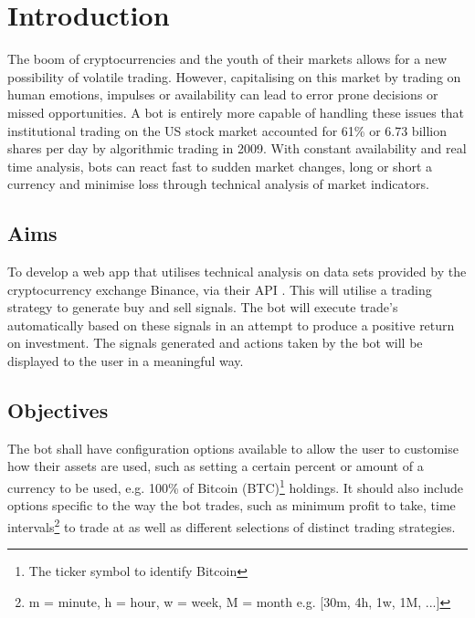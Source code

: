 
\chapter{Introduction}
\label{sec:intro}


The boom of cryptocurrencies and the youth of their markets allows for a new possibility of volatile trading. However, capitalising on this market by trading on human emotions, impulses or availability can lead to error prone decisions or missed opportunities. A bot is entirely more capable of handling these issues that institutional trading on the US stock market accounted for 61\% or 6.73 billion shares \cite{WEB:Cheng:2017} per day by algorithmic trading in 2009. With constant availability and real time analysis, bots can react fast to sudden market changes, long or short a currency and minimise loss through technical analysis of market indicators. \par






\section{Aims}
\label{sec:intro:aims}
\noindent To develop a web app that utilises technical analysis on data sets provided by the cryptocurrency exchange Binance, via their API \cite{WEB:BINANCE_API:2018}. This will utilise a trading strategy to generate buy and sell signals. The bot will execute trade's automatically based on these signals in an attempt to produce a positive return on investment. The signals generated and actions taken by the bot will be displayed to the user in a meaningful way.


\section{Objectives}
\label{sec:intro:objectives}
\noindent The bot shall have configuration options available to allow the user to customise how their assets are used, such as setting a certain percent or amount of a currency to be used, e.g. 100\% of Bitcoin (BTC)\footnote{The ticker symbol to identify Bitcoin} holdings. It should also include options specific to the way the bot trades, such as minimum profit to take, time intervals\footnote{m = minute, h = hour, w = week, M = month e.g. [30m, 4h, 1w, 1M, ...]} to trade at as well as different selections of distinct trading strategies.

